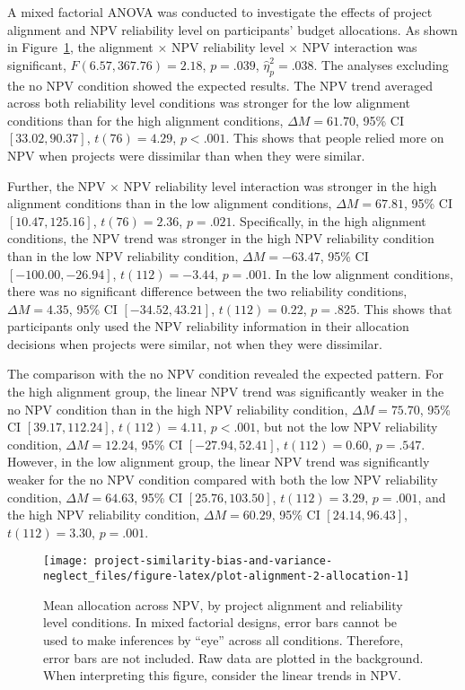 \documentclass[
  english,
  man, donotrepeattitle,floatsintext]{apa7}
\theoremstyle{definition}
\theoremstyle{definition}
\theoremstyle{definition}
\theoremstyle{definition}
\theoremstyle{remark}
\begin{document}
A mixed factorial ANOVA was conducted to investigate the effects of project
alignment and NPV reliability level on participants' budget allocations. As
shown in Figure~\ref{fig:plot-alignment-2-allocation}, the alignment \(\times\)
NPV reliability level \(\times\) NPV interaction was significant,
\(F(6.57, 367.76) = 2.18\), \(p = .039\), \(\hat{\eta}^2_p = .038\). The
analyses excluding the no NPV condition showed the expected results. The NPV
trend averaged across both reliability level conditions was stronger for the low
alignment conditions than for the high alignment conditions,
\(\Delta M = 61.70\), 95\% CI \([33.02, 90.37]\), \(t(76) = 4.29\), \(p < .001\). This shows that people
relied more on NPV when projects were dissimilar than when they were similar.

Further, the NPV \(\times\) NPV reliability level interaction was stronger in the high
alignment conditions than in the low alignment conditions,
\(\Delta M = 67.81\), 95\% CI \([10.47, 125.16]\), \(t(76) = 2.36\), \(p = .021\). Specifically, in
the high alignment conditions, the NPV trend was stronger in the high NPV
reliability condition than in the low NPV reliability condition,
\(\Delta M = -63.47\), 95\% CI \([-100.00, -26.94]\), \(t(112) = -3.44\), \(p = .001\). In the low alignment
conditions, there was no significant difference between the two
reliability conditions, \(\Delta M = 4.35\), 95\% CI \([-34.52, 43.21]\), \(t(112) = 0.22\), \(p = .825\).
This shows that participants only used the NPV reliability information in their
allocation decisions when projects were similar, not when they were dissimilar.

The comparison with the no NPV condition revealed the expected pattern. For the
high alignment group, the linear NPV trend was significantly weaker in the no
NPV condition than in the high NPV reliability condition,
\(\Delta M = 75.70\), 95\% CI \([39.17, 112.24]\), \(t(112) = 4.11\), \(p < .001\), but not the low
NPV reliability condition, \(\Delta M = 12.24\), 95\% CI \([-27.94, 52.41]\), \(t(112) = 0.60\), \(p = .547\).
However, in the low alignment group, the linear NPV trend was significantly
weaker for the no NPV condition compared with both the low NPV reliability
condition, \(\Delta M = 64.63\), 95\% CI \([25.76, 103.50]\), \(t(112) = 3.29\), \(p = .001\),
and the high NPV reliability condition,
\(\Delta M = 60.29\), 95\% CI \([24.14, 96.43]\), \(t(112) = 3.30\), \(p = .001\).



\begin{figure}
\texttt{[image: project-similarity-bias-and-variance-neglect\_files/figure-latex/plot-alignment-2-allocation-1]} \caption{Mean allocation across NPV, by project alignment and reliability level conditions. In mixed factorial designs, error bars cannot be used to make inferences by ``eye'' across all conditions. Therefore, error bars are not included. Raw data are plotted in the background. When interpreting this figure, consider the linear trends in NPV.}\label{fig:plot-alignment-2-allocation}
\end{figure}
\end{document}
